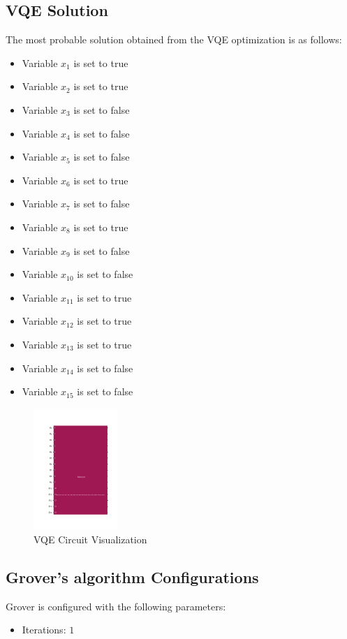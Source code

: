 \documentclass{article}%
\begin{document}
%
\subsection{VQE Solution}%
\label{subsec:VQESolution}%
The most probable solution obtained from the VQE optimization is as follows:\newline%
%
\begin{itemize}%
\item Variable \( x_1 \) is set to true%
\item Variable \( x_2 \) is set to true%
\item Variable \( x_3 \) is set to false%
\item Variable \( x_4 \) is set to false%
\item Variable \( x_5 \) is set to false%
\item Variable \( x_6 \) is set to true%
\item Variable \( x_7 \) is set to false%
\item Variable \( x_8 \) is set to true%
\item Variable \( x_9 \) is set to false%
\item Variable \( x_10 \) is set to false%
\item Variable \( x_11 \) is set to true%
\item Variable \( x_12 \) is set to true%
\item Variable \( x_13 \) is set to true%
\item Variable \( x_14 \) is set to false%
\item Variable \( x_15 \) is set to false%
\end{itemize}

%


\begin{figure}[h!]%
\centering%
\includegraphics[width=120px]{quantum_circuit_vqe.png}%
\caption{VQE Circuit Visualization}%
\end{figure}

%
\subsection{Grover's algorithm Configurations}%
\label{subsec:GroversalgorithmConfigurations}%
Grover is configured with the following parameters:\newline%
%
\begin{itemize}%
\item%
Iterations: \(1\)%
\end{itemize}
\end{document}
